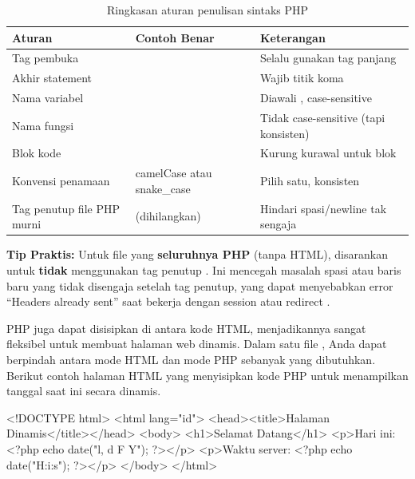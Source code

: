 \begin{table}[H]
\centering
\begin{tabular}{|P{3.5cm}|P{4cm}|P{4.5cm}|}
\hline
\textbf{Aturan} & \textbf{Contoh Benar} & \textbf{Keterangan} \\
\hline
Tag pembuka &  & Selalu gunakan tag panjang \\
\hline
Akhir statement &  & Wajib titik koma \\
\hline
Nama variabel &  & Diawali \code{\$}, case-sensitive \\
\hline
Nama fungsi &  & Tidak case-sensitive (tapi konsisten) \\
\hline
Blok kode &  & Kurung kurawal untuk blok \\
\hline
Konvensi penamaan & camelCase atau snake\_case & Pilih satu, konsisten \\
\hline
Tag penutup file PHP murni & (dihilangkan) & Hindari spasi/newline tak sengaja \\
\hline
\end{tabular}
\caption{Ringkasan aturan penulisan sintaks PHP}
\end{table}

\begin{catatan}
\textbf{Tip Praktis:} Untuk file yang \textbf{seluruhnya PHP} (tanpa HTML), disarankan untuk \textbf{tidak} menggunakan tag penutup . Ini mencegah masalah spasi atau baris baru yang tidak disengaja setelah tag penutup, yang dapat menyebabkan error ``Headers already sent'' saat bekerja dengan session atau redirect \cite{phpRightWay}.
\end{catatan}

PHP juga dapat disisipkan di antara kode HTML, menjadikannya sangat fleksibel untuk membuat halaman web dinamis. Dalam satu file , Anda dapat berpindah antara mode HTML dan mode PHP sebanyak yang dibutuhkan. Berikut contoh halaman HTML yang menyisipkan kode PHP untuk menampilkan tanggal saat ini secara dinamis.

\begin{webcode}[language=PHP, caption={Menyisipkan PHP di dalam HTML}]
<!DOCTYPE html>
<html lang="id">
<head><title>Halaman Dinamis</title></head>
<body>
  <h1>Selamat Datang</h1>
  <p>Hari ini: <?php echo date("l, d F Y"); ?></p>
  <p>Waktu server: <?php echo date("H:i:s"); ?></p>
</body>
</html>
\end{webcode}

